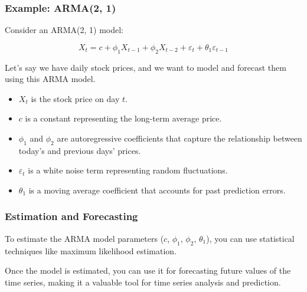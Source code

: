 	\begin{frame}
		\frametitle{Example: ARMA(2, 1)}
		
		Consider an ARMA(2, 1) model:
		
		\[
		X_t = c + \phi_1 X_{t-1} + \phi_2 X_{t-2} + \varepsilon_t + \theta_1 \varepsilon_{t-1}
		\]
		
		Let's say we have daily stock prices, and we want to model and forecast them using this ARMA model.
		
		\begin{itemize}
			\item $X_t$ is the stock price on day $t$.
			\item $c$ is a constant representing the long-term average price.
			\item $\phi_1$ and $\phi_2$ are autoregressive coefficients that capture the relationship between today's and previous days' prices.
			\item $\varepsilon_t$ is a white noise term representing random fluctuations.
			\item $\theta_1$ is a moving average coefficient that accounts for past prediction errors.
		\end{itemize}
		
	\end{frame}
	
	\begin{frame}
		\frametitle{Estimation and Forecasting}
		
		To estimate the ARMA model parameters ($c$, $\phi_1$, $\phi_2$, $\theta_1$), you can use statistical techniques like maximum likelihood estimation.
		
		Once the model is estimated, you can use it for forecasting future values of the time series, making it a valuable tool for time series analysis and prediction.
		
	\end{frame}
	

\begin{frame}
\begin{itemize}
\end{itemize}
\end{frame}


